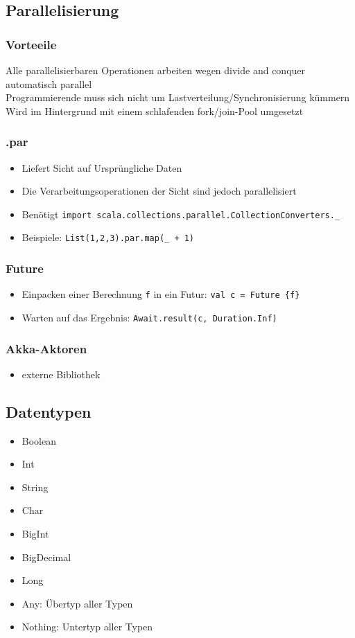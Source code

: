 \subsection{Parallelisierung}
\subsubsection{Vorteeile}
Alle parallelisierbaren Operationen arbeiten wegen \glqq{}divide and conquer\grqq{} automatisch parallel \\
Programmierende muss sich nicht um Lastverteilung/Synchronisierung kümmern \\
Wird im Hintergrund mit einem schlafenden fork/join-Pool umgesetzt
\subsubsection{.par}
\begin{itemize}
	\item Liefert Sicht auf Ursprüngliche Daten
	\item Die Verarbeitungsoperationen der Sicht sind jedoch parallelisiert
	\item Benötigt \verb|import scala.collections.parallel.CollectionConverters._|
	\item Beispiele: \verb|List(1,2,3).par.map(_ + 1)|
\end{itemize}
\subsubsection{Future}
\begin{itemize}
	\item Einpacken einer Berechnung \verb|f| in ein Futur: \verb|val c = Future {f}|
	\item Warten auf das Ergebnis: \verb|Await.result(c, Duration.Inf)|
\end{itemize}
\subsubsection{Akka-Aktoren}
\begin{itemize}
	\item externe Bibliothek
\end{itemize}
\subsection{Datentypen}
\begin{itemize}
	\item Boolean
	\item Int
	\item String
	\item Char
	\item BigInt
	\item BigDecimal
	\item Long
	\item Any: Übertyp aller Typen
	\item Nothing: Untertyp aller Typen
\end{itemize}

